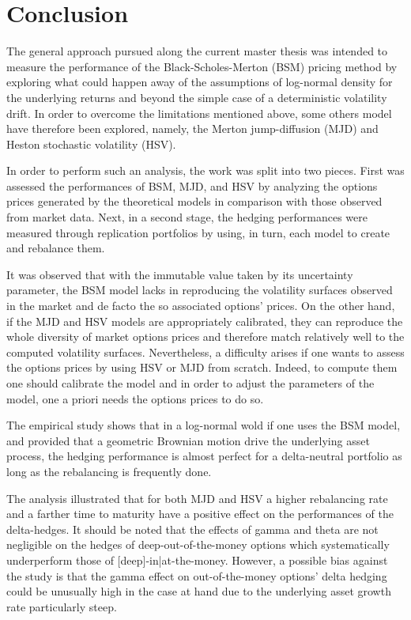 \documentclass[12pt,a4paper]{report}
\begin{document}
\chapter{Conclusion}
\label{cha:conclusion}


The general approach pursued along the current master thesis was intended to measure the performance of the Black-Scholes-Merton (BSM) pricing method by exploring what could happen away of the assumptions of log-normal density for the underlying returns and beyond the simple case of a deterministic volatility drift.
In order to overcome the limitations mentioned above, some others model have therefore been explored, namely,  the Merton jump-diffusion (MJD) and Heston stochastic volatility (HSV).

In order to perform such an analysis, the work was split into two pieces. First was assessed the performances of BSM, MJD, and HSV by analyzing the options prices generated by the theoretical models in comparison with those observed from market data. 
Next, in a second stage, the hedging performances were measured through replication portfolios by using, in turn, each model to create and rebalance them.

It was observed that with the immutable value taken by its uncertainty parameter, the BSM model lacks in reproducing the volatility surfaces observed in the market and de facto the so associated options' prices.
On the other hand, if the MJD and HSV models are appropriately calibrated, they can reproduce the whole diversity of market options prices and therefore match relatively well to the computed volatility surfaces. 
Nevertheless, a difficulty arises if one wants to assess the options prices by using HSV or MJD from scratch. Indeed, to compute them one should calibrate the model and in order to adjust the parameters of the model, one a priori needs the options prices to do so. 

The empirical study shows that in a log-normal wold if one uses the BSM model, and provided that a geometric Brownian motion drive the underlying asset process, the hedging performance is almost perfect for a delta-neutral portfolio as long as the rebalancing is frequently done.

The analysis illustrated that for both MJD and HSV a higher rebalancing rate and a farther time to maturity have a positive effect on the performances of the delta-hedges. It should be noted that the effects of gamma and theta are not negligible on the hedges of deep-out-of-the-money options which systematically underperform those of [deep]-in|at-the-money.
However, a possible bias against the study is that the gamma effect on out-of-the-money options' delta hedging could be unusually high in the case at hand due to the underlying asset growth rate particularly steep.
\end{document}
